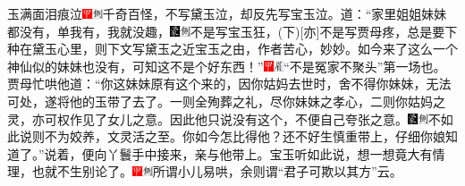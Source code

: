 玉满面泪痕泣{\includegraphics[width=3mm]{../Images/00002}\includegraphics[width=3mm]{../Images/00011}\footnotesize \kaishu 千奇百怪，不写黛玉泣，却反先写宝玉泣。}道：``家里姐姐妹妹都没有，单我有，我就没趣，{\includegraphics[width=3mm]{../Images/00006}\includegraphics[width=3mm]{../Images/00011}\footnotesize \kaishu 不是写宝玉狂，{(下)}{[}亦{]}不是写贾母疼，总是要下种在黛玉心里，则下文写黛玉之近宝玉之由，作者苦心，妙妙。}如今来了这么一个神仙似的妹妹也没有，可知这不是个好东西！''{\includegraphics[width=3mm]{../Images/00002}\includegraphics[width=3mm]{../Images/00010}\footnotesize \kaishu ``不是冤家不聚头''第一场也。}贾母忙哄他道：``你这妹妹原有这个来的，因你姑妈去世时，舍不得你妹妹，无法可处，遂将他的玉带了去了。一则全殉葬之礼，尽你妹妹之孝心，二则你姑妈之灵，亦可权作见了女儿之意。因此他只说没有这个，不便自己夸张之意。{\includegraphics[width=3mm]{../Images/00006}\includegraphics[width=3mm]{../Images/00011}\footnotesize \kaishu 不如此说则不为姣养，文灵活之至。}你如今怎比得他？还不好生慎重带上，仔细你娘知道了。''说着，便向丫鬟手中接来，亲与他带上。宝玉听如此说，想一想竟大有情理，也就不生别论了。{\includegraphics[width=3mm]{../Images/00002}\includegraphics[width=3mm]{../Images/00011}\footnotesize \kaishu 所谓小儿易哄，余则谓``君子可欺以其方''云。}

